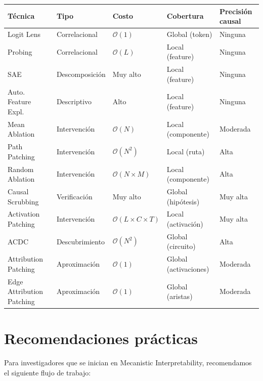 \documentclass[11pt,a4paper]{report}
\theoremstyle{definition}
\begin{document}
\begin{center}
\begin{tabular}{lp{3cm}p{2.5cm}p{2.5cm}p{2.5cm}}
\toprule
\textbf{Técnica} & \textbf{Tipo} & \textbf{Costo} & \textbf{Cobertura} & \textbf{Precisión causal} \\
\midrule
Logit Lens & Correlacional & $\mathcal{O}(1)$ & Global (token) & Ninguna \\
Probing & Correlacional & $\mathcal{O}(L)$ & Local (feature) & Ninguna \\
SAE & Descomposición & Muy alto & Local (feature) & Ninguna \\
Auto. Feature Expl. & Descriptivo & Alto & Local (feature) & Ninguna \\
Mean Ablation & Intervención & $\mathcal{O}(N)$ & Local (componente) & Moderada \\
Path Patching & Intervención & $\mathcal{O}(N^2)$ & Local (ruta) & Alta \\
Random Ablation & Intervención & $\mathcal{O}(N \times M)$ & Local (componente) & Alta \\
Causal Scrubbing & Verificación & Muy alto & Global (hipótesis) & Muy alta \\
Activation Patching & Intervención & $\mathcal{O}(L \times C \times T)$ & Local (activación) & Muy alta \\
ACDC & Descubrimiento & $\mathcal{O}(N^2)$ & Global (circuito) & Alta \\
Attribution Patching & Aproximación & $\mathcal{O}(1)$ & Global (activaciones) & Moderada \\
Edge Attribution Patching & Aproximación & $\mathcal{O}(1)$ & Global (aristas) & Moderada \\
\bottomrule
\end{tabular}
\end{center}

\section{Recomendaciones prácticas}

Para investigadores que se inician en Mecanistic Interpretability, recomendamos el siguiente flujo de trabajo:
\end{document}
